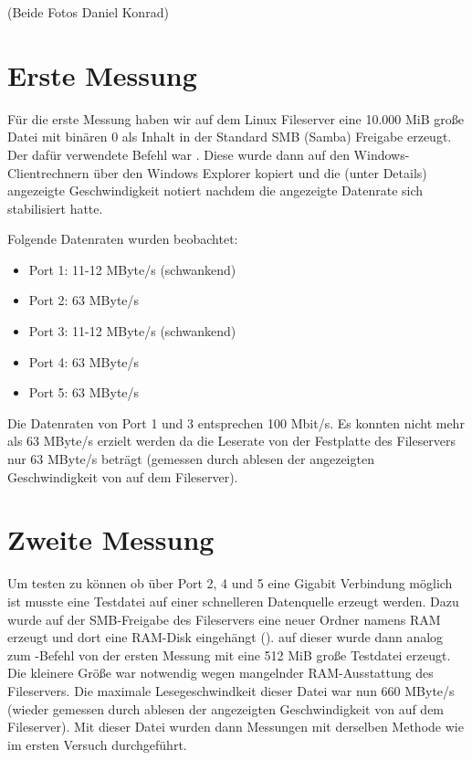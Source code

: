 \documentclass[11pt,a4paper,titlepage]{scrartcl} %
\begin{document}
(Beide Fotos \textcopyright Daniel Konrad)

\newpage
\section{Erste Messung}
Für die erste Messung haben wir auf dem Linux Fileserver eine 10.000 MiB große Datei mit binären 0 als Inhalt in der Standard SMB (Samba) Freigabe erzeugt. Der dafür verwendete Befehl war \normalfont. Diese wurde dann auf den Windows-Clientrechnern über  den Windows Explorer kopiert und die (unter Details) angezeigte Geschwindigkeit notiert nachdem die angezeigte Datenrate sich stabilisiert hatte.

Folgende Datenraten wurden beobachtet:
\begin{itemize}
\item Port 1: 11-12 MByte/s (schwankend)
\item Port 2: 63 MByte/s
\item Port 3: 11-12 MByte/s (schwankend)
\item Port 4: 63 MByte/s
\item Port 5: 63 MByte/s
\end{itemize}
Die Datenraten von Port 1 und 3 entsprechen 100 Mbit/s.
Es konnten nicht mehr als 63 MByte/s erzielt werden da die Leserate von der Festplatte des Fileservers nur 63 MByte/s beträgt (gemessen durch ablesen der angezeigten Geschwindigkeit von  \normalfont auf dem Fileserver).

\newpage
\section{Zweite Messung}
Um testen zu können ob über Port 2, 4 und 5 eine Gigabit Verbindung möglich ist musste eine Testdatei auf einer schnelleren Datenquelle erzeugt werden. Dazu wurde auf der SMB-Freigabe des Fileservers eine neuer Ordner namens RAM erzeugt und dort eine RAM-Disk eingehängt (\normalfont). auf dieser wurde dann analog zum \normalfont-Befehl von der ersten Messung mit \normalfont eine 512 MiB große Testdatei erzeugt. Die kleinere Größe war notwendig wegen mangelnder RAM-Ausstattung des Fileservers. Die maximale Lesegeschwindkeit dieser Datei war nun 660 MByte/s (wieder gemessen durch ablesen der angezeigten Geschwindigkeit von  \normalfont auf dem Fileserver). Mit dieser Datei wurden dann Messungen mit derselben Methode wie im ersten Versuch durchgeführt.
\end{document}
